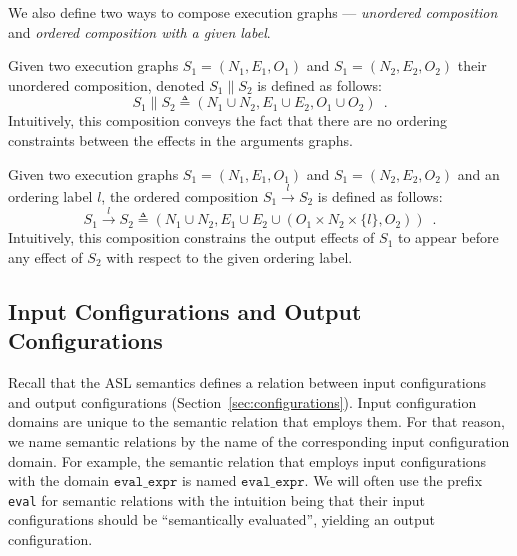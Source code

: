 \documentclass{book}
\newcommand\secref[1]{Section~\ref{sec:#1}}
\newcommand\ordered[3]{{#1}\xrightarrow{#2}{#3}}
\begin{document}
We also define two ways to compose execution graphs --- \emph{unordered composition} and
\emph{ordered composition with a given label}.

Given two execution graphs $S_1 = (N_1, E_1, O_1)$ and $S_1 = (N_2, E_2, O_2)$ their unordered composition,
denoted $S_1 \parallel S_2$ is defined as follows:
\[
  S_1 \parallel S_2\triangleq (N_1 \cup N_2, E_1 \cup E_2, O_1 \cup O_2) \enspace.
\]
Intuitively, this composition conveys the fact that there are no ordering constraints between the effects
in the arguments graphs.

Given two execution graphs $S_1 = (N_1, E_1, O_1)$ and $S_1 = (N_2, E_2, O_2)$ and an ordering label $l$,
the ordered composition $\ordered{S_1}{l}{S_2}$ is defined as follows:
\[
  \ordered{S_1}{l}{S_2} \triangleq (N_1 \cup N_2, E_1 \cup E_2 \cup (O_1 \times N_2 \times \{l\}, O_2)) \enspace.
\]
Intuitively, this composition constrains the output effects of $S_1$ to appear before any effect of $S_2$ with respect
to the given ordering label.

\subsection{Input Configurations and Output Configurations}

Recall that the ASL semantics defines a relation between input configurations and output configurations
(\secref{configurations}).
Input configuration domains are unique to the semantic relation that employs them.
For that reason, we name semantic relations by the name of the corresponding input configuration domain.
For example, the semantic relation that employs input configurations with the domain $\texttt{eval\_expr}$
is named $\texttt{eval\_expr}$.
%
We will often use the prefix \texttt{eval} for semantic relations with the intuition being that their input configurations
should be ``semantically evaluated'', yielding an output configuration.
\end{document}
